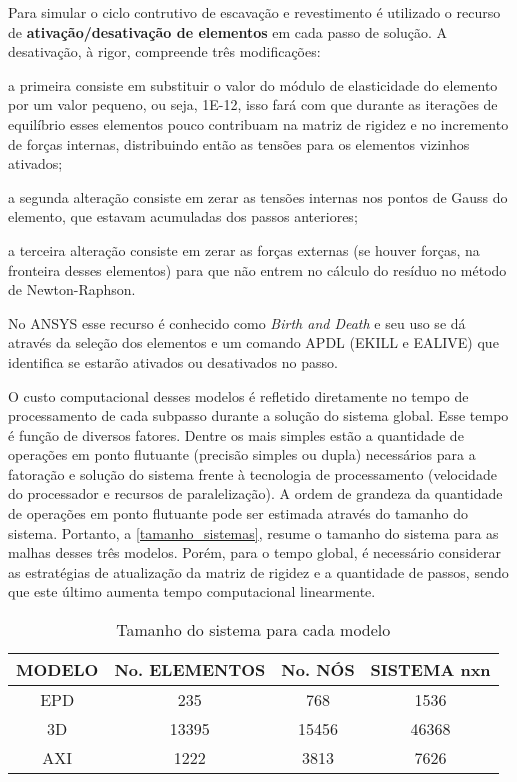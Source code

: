 Para simular o ciclo contrutivo de escavação e revestimento é utilizado o recurso de \textbf{ativação/desativação de elementos} em cada passo de solução. A desativação, à rigor, compreende três modificações:
\begin{alineas}
	
	\item a primeira consiste em substituir o valor do módulo de elasticidade do elemento por um valor pequeno, ou seja, 1E-12, isso fará com que durante as iterações de equilíbrio esses elementos pouco contribuam na matriz de rigidez e no incremento de forças internas, distribuindo então as tensões para os elementos vizinhos ativados;
	
	\item a segunda alteração consiste em zerar as tensões internas nos pontos de Gauss do elemento, que estavam acumuladas dos passos anteriores; 
	
	\item a terceira alteração consiste em zerar as forças externas (se houver forças, na fronteira desses elementos) para que não entrem no cálculo do resíduo no método de Newton-Raphson.
	
\end{alineas}

No ANSYS esse recurso é conhecido como \textit{Birth and Death} e seu uso se dá através da seleção dos elementos e um comando APDL (EKILL e EALIVE) que identifica se estarão ativados ou desativados no passo.

O custo computacional desses modelos é refletido diretamente no tempo de processamento de cada subpasso durante a solução do sistema global. Esse tempo é função de diversos fatores. Dentre os mais simples estão a quantidade de operações em ponto flutuante (precisão simples ou dupla) necessários para a fatoração e solução do sistema frente à tecnologia de processamento (velocidade do processador e recursos de paralelização). A ordem de grandeza da quantidade de operações em ponto flutuante pode ser estimada através do tamanho do sistema. Portanto, a \autoref{tamanho_sistemas}, resume o tamanho do sistema para as malhas desses três modelos. Porém, para o tempo global, é necessário considerar as estratégias de atualização da matriz de rigidez e a quantidade de passos, sendo que este último aumenta tempo computacional linearmente.

\begin{table}[H]
	\caption{Tamanho do sistema para cada modelo}
	\label{tamanho_sistemas}
	\centering
	\small
	\renewcommand{\arraystretch}{1.25}
	\begin{tabular}{c c c c}
		\hline
		\multicolumn{1}{c}{\textbf{MODELO}} &
		\multicolumn{1}{c}{\textbf{No. ELEMENTOS}} &
		\multicolumn{1}{c}{\textbf{No. NÓS}} &
		\multicolumn{1}{c}{\textbf{SISTEMA nxn}} \\
		\hline
		EPD & 235 & 768 & 1536 \\
		3D & 13395 & 15456 & 46368 \\
		AXI & 1222 & 3813 & 7626 \\
		\hline
	\end{tabular}
	\normalsize
\end{table}

